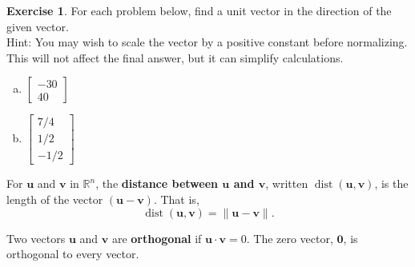 \documentclass[10pt]{book}
\newcommand{\boxcolor}{gray!30}
\newenvironment{boxdef}{\begin{mdframed}[backgroundcolor=\boxcolor,linewidth=0pt,nobreak=true]}{\end{mdframed}}
\theoremstyle{definition}
\newtheorem{exercise}{Exercise}[section]
\newcommand{\R}{\mathbb{R}}
\newcommand{\vect}[1]{\ensuremath{\boldsymbol{\mathbf{#1}}}}
\DeclareMathOperator{\dist}{dist}
\begin{document}
\begin{exercise} %
	For each problem below, find a unit vector in the direction of the given vector. \\
	Hint: You may wish to scale the vector by a positive constant before normalizing. This will not affect the final answer, but it can simplify calculations.
	\begin{multicols}{2}
		\begin{enumerate}[(a)]
			\item $\begin{bmatrix}-30\\40\end{bmatrix}$
			\columnbreak
			\item $\begin{bmatrix}7/4\\1/2\\-1/2\end{bmatrix}$
		\end{enumerate}
	\end{multicols}
\end{exercise}
\vfill


\newpage


\begin{boxdef}
	For $\vect{u}$ and $\vect{v}$ in $\R^n$, the \textbf{distance between $\boldsymbol{\vect{u}}$ and $\boldsymbol{\vect{v}}$}, written $\dist(\vect{u},\vect{v})$, is the length of the vector $(\vect{u}-\vect{v})$. That is,
	\vspace{-1ex}
	$$ \dist(\vect{u},\vect{v}) = \| \vect{u}-\vect{v} \|. $$
\end{boxdef}
\vspace{-1em}
\begin{boxdef}
	Two vectors $\vect{u}$ and $\vect{v}$ are \textbf{orthogonal} if $\vect{u}\cdot\vect{v}=0$. The zero vector, $\vect{0}$, is orthogonal to every vector.
\end{boxdef}
\end{document}

